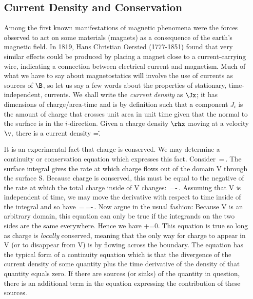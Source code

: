 \subsection{Current Density and Conservation}
Among the first known manifestations of magnetic phenomena were the forces
observed to act on some materials (magnets) as a consequence of the earth's
magnetic field. In 1819, Hans Christian Oersted (1777-1851) found that very
similar effects could be produced by placing a magnet close to a
current-carrying wire, indicating a connection between electrical current
and magnetism. Much of what we have to say about magnetostatics will
involve the use of currents as sources of $\B$, so let us say a few words
about the properties of stationary, \ie time-independent, currents.
We shall write the {\em current density} as $\Jx$; it has dimensions of
charge/area-time and is by definition such that a component $J_i$ is the
amount of charge that crosses unit area in unit time given that the normal
to the surface is in the $i$-direction. Given a charge density $\rhx$ moving
at a velocity $\v$, there is a current density
\beq
\Jx=\rhx\v.
\eeq

It is an experimental fact that charge is conserved. We may determine a
continuity or conservation equation which expresses this fact. Consider
\beq
\inv\,\div\Jx=\ina\,\J\cdot\nn.
\eeq
The surface integral gives the rate at which charge flows out of the domain
V through the surface S. Because charge is conserved, this must be equal to
the negative of the rate at which the total charge inside of V changes:
\beq
\ina\,\Jx\cdot\nn=-\lep\inv\,\rhx\rip.
\eeq
Assuming that V is independent of time, we may move the derivative with
respect to time inside of the integral and so have
\beq
\inv\,\div\Jx=\ina\,\Jx\cdot\nn=-\inv\,.
\eeq
Now argue in the usual fashion: Because V is an arbitrary domain, this
equation can only be true if the integrands on the two sides are the same
everywhere. Hence we have
\beq
\div\Jx+=0.
\eeq
This equation is true so long as charge is {\em locally} conserved, meaning
that the only way for charge to appear in V (or to disappear from V) is by
flowing across the boundary. The equation has the typical form of a
continuity equation which is that the divergence of the current density
of some quantity plus the time derivative of the density of that quantity
equals zero. If there are sources (or sinks) of the quantity in question,
there is an additional term in the equation expressing the contribution of
these sources.

